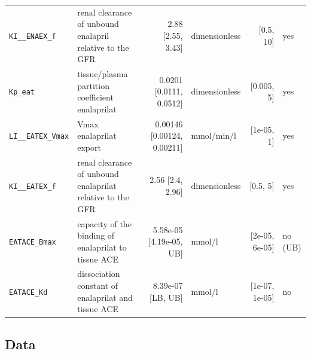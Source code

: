 \begin{longtable}{llrlrl}
\texttt{KI\_\_ENAEX\_f} & renal clearance of unbound enalapril relative to the GFR & 2.88 [2.55, 3.43] & dimensionless & [0.5, 10] & yes \\
\texttt{Kp\_eat} & tissue/plasma partition coefficient enalaprilat & 0.0201 [0.0111, 0.0512] & dimensionless & [0.005, 5] & yes \\
\texttt{LI\_\_EATEX\_Vmax} & Vmax enalaprilat export & 0.00146 [0.00124, 0.00211] & mmol/min/l & [1e-05, 1] & yes \\
\texttt{KI\_\_EATEX\_f} & renal clearance of unbound enalaprilat relative to the GFR & 2.56 [2.4, 2.96] & dimensionless & [0.5, 5] & yes \\
\texttt{EATACE\_Bmax} & capacity of the binding of enalaprilat to tissue ACE & 5.58e-05 [4.19e-05, UB] & mmol/l & [2e-05, 6e-05] & no (UB) \\
\texttt{EATACE\_Kd} & dissociation constant of enalaprilat and tissue ACE & 8.39e-07 [LB, UB] & mmol/l & [1e-07, 1e-05] & no \\
\end{longtable}

\subsection{Data}

